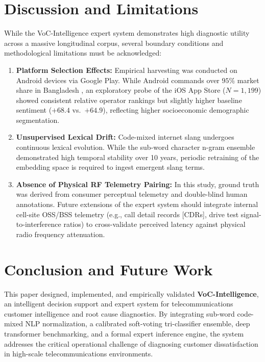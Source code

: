 \documentclass[review,12pt,authoryear]{elsarticle}
\begin{document}
\section{Discussion and Limitations}
\label{sec:limitations}

While the VoC-Intelligence expert system demonstrates high diagnostic utility across a massive longitudinal corpus, several boundary conditions and methodological limitations must be acknowledged:
\begin{enumerate}
    \item \textbf{Platform Selection Effects:} Empirical harvesting was conducted on Android devices via Google Play. While Android commands over $95\%$ market share in Bangladesh \citep{btrc2026quarterly}, an exploratory probe of the iOS App Store ($N = 1{,}199$) showed consistent relative operator rankings but slightly higher baseline sentiment ($+68.4$ vs.\ $+64.9$), reflecting higher socioeconomic demographic segmentation.
    \item \textbf{Unsupervised Lexical Drift:} Code-mixed internet slang undergoes continuous lexical evolution. While the sub-word character n-gram ensemble demonstrated high temporal stability over 10 years, periodic retraining of the embedding space is required to ingest emergent slang terms.
    \item \textbf{Absence of Physical RF Telemetry Pairing:} In this study, ground truth was derived from consumer perceptual telemetry and double-blind human annotations. Future extensions of the expert system should integrate internal cell-site OSS/BSS telemetry (e.g., call detail records [CDRs], drive test signal-to-interference ratios) to cross-validate perceived latency against physical radio frequency attenuation.
\end{enumerate}

\section{Conclusion and Future Work}
\label{sec:conclusion}

This paper designed, implemented, and empirically validated \textbf{VoC-Intelligence}, an intelligent decision support and expert system for telecommunications customer intelligence and root cause diagnostics. By integrating sub-word code-mixed NLP normalization, a calibrated soft-voting tri-classifier ensemble, deep transformer benchmarking, and a formal expert inference engine, the system addresses the critical operational challenge of diagnosing customer dissatisfaction in high-scale telecommunications environments.
\end{document}

